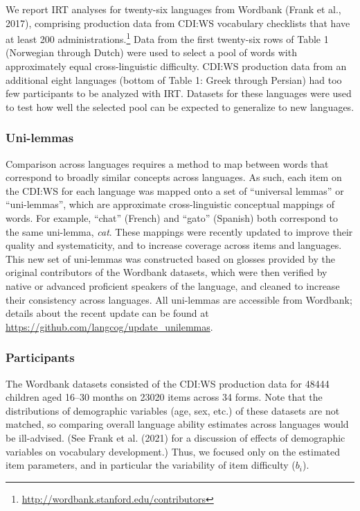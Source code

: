 \documentclass[10pt, letterpaper]{article}
\begin{document}
We report IRT analyses for twenty-six languages from Wordbank (Frank et
al., 2017), comprising production data from CDI:WS vocabulary checklists
that have at least 200 administrations.\footnote{\url{http://wordbank.stanford.edu/contributors}}
Data from the first twenty-six rows of Table 1 (Norwegian through Dutch)
were used to select a pool of words with approximately equal
cross-linguistic difficulty. CDI:WS production data from an additional
eight languages (bottom of Table 1: Greek through Persian) had too few
participants to be analyzed with IRT. Datasets for these languages were
used to test how well the selected pool can be expected to generalize to
new languages.

\hypertarget{uni-lemmas}{%
\subsubsection{Uni-lemmas}\label{uni-lemmas}}

Comparison across languages requires a method to map between words that
correspond to broadly similar concepts across languages. As such, each
item on the CDI:WS for each language was mapped onto a set of
``universal lemmas'' or ``uni-lemmas'', which are approximate
cross-linguistic conceptual mappings of words. For example, ``chat''
(French) and ``gato'' (Spanish) both correspond to the same uni-lemma,
\emph{cat}. These mappings were recently updated to improve their
quality and systematicity, and to increase coverage across items and
languages. This new set of uni-lemmas was constructed based on glosses
provided by the original contributors of the Wordbank datasets, which
were then verified by native or advanced proficient speakers of the
language, and cleaned to increase their consistency across languages.
All uni-lemmas are accessible from Wordbank; details about the recent
update can be found at
\url{https://github.com/langcog/update_unilemmas}.

\hypertarget{participants}{%
\subsubsection{Participants}\label{participants}}

The Wordbank datasets consisted of the CDI:WS production data for 48444
children aged 16--30 months on 23020 items across 34 forms. Note that
the distributions of demographic variables (age, sex, etc.) of these
datasets are not matched, so comparing overall language ability
estimates across languages would be ill-advised. (See Frank et al.
(2021) for a discussion of effects of demographic variables on
vocabulary development.) Thus, we focused only on the estimated item
parameters, and in particular the variability of item difficulty
(\(b_i\)).
\end{document}
